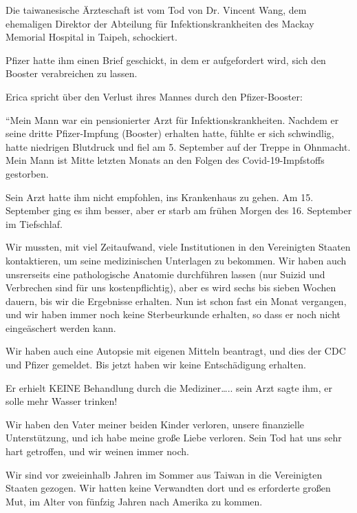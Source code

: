 Die taiwanesische Ärzteschaft ist vom Tod von Dr. Vincent Wang, dem ehemaligen
Direktor der Abteilung für Infektionskrankheiten des Mackay Memorial Hospital in
Taipeh, schockiert.

Pfizer hatte ihm einen Brief geschickt, in dem er aufgefordert wird, sich den
Booster verabreichen zu lassen.

Erica spricht über den Verlust ihres Mannes durch den Pfizer-Booster:

“Mein Mann war ein pensionierter Arzt für Infektionskrankheiten. Nachdem er
seine dritte Pfizer-Impfung (Booster) erhalten hatte, fühlte er sich schwindlig,
hatte niedrigen Blutdruck und fiel am 5. September auf der Treppe in
Ohnmacht. Mein Mann ist Mitte letzten Monats an den Folgen des
Covid-19-Impfstoffs gestorben.

Sein Arzt hatte ihm nicht empfohlen, ins Krankenhaus zu gehen. Am 15. September
ging es ihm besser, aber er starb am frühen Morgen des 16. September im
Tiefschlaf.

Wir mussten, mit viel Zeitaufwand, viele Institutionen in den Vereinigten
Staaten kontaktieren, um seine medizinischen Unterlagen zu bekommen. Wir haben
auch unsrerseits eine pathologische Anatomie durchführen lassen (nur Suizid und
Verbrechen sind für uns kostenpflichtig), aber es wird sechs bis sieben Wochen
dauern, bis wir die Ergebnisse erhalten. Nun ist schon fast ein Monat vergangen,
und wir haben immer noch keine Sterbeurkunde erhalten, so dass er noch nicht
eingeäschert werden kann.

Wir haben auch eine Autopsie mit eigenen Mitteln beantragt, und dies der CDC und
Pfizer gemeldet. Bis jetzt haben wir keine Entschädigung erhalten.

Er erhielt KEINE Behandlung durch die Mediziner….. sein Arzt sagte ihm, er solle
mehr Wasser trinken!

Wir haben den Vater meiner beiden Kinder verloren, unsere finanzielle
Unterstützung, und ich habe meine große Liebe verloren. Sein Tod hat uns sehr
hart getroffen, und wir weinen immer noch.

Wir sind vor zweieinhalb Jahren im Sommer aus Taiwan in die Vereinigten Staaten
gezogen. Wir hatten keine Verwandten dort und es erforderte großen Mut, im Alter
von fünfzig Jahren nach Amerika zu kommen.
